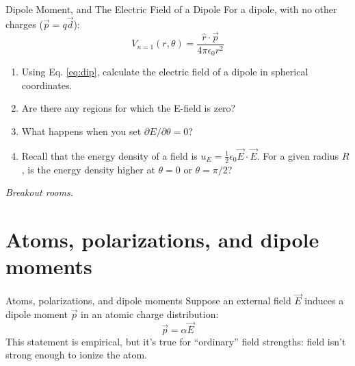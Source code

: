 \documentclass{beamer}
\begin{document}
\begin{frame}{Dipole Moment, and The Electric Field of a Dipole}
For a dipole, with no other charges ($\vec{p} = q\vec{d}$):
\begin{equation}
V_{n=1}(r,\theta) = \frac{\hat{r}\cdot\vec{p}}{4\pi\epsilon_0 r^2} \label{eq:dip}
\end{equation}
\begin{enumerate}
\item Using Eq. \ref{eq:dip}, calculate the electric field of a dipole in spherical coordinates.
\item Are there any regions for which the E-field is zero?
\item What happens when you set $\partial E/\partial \theta = 0$?
\item Recall that the energy density of a field is $u_E = \frac{1}{2}\epsilon_0 \vec{E} \cdot \vec{E}$.  For a given radius $R$, is the energy density higher at $\theta = 0$ or $\theta = \pi/2$?
\end{enumerate}
\textit{Breakout rooms.}
\end{frame}

\section{Atoms, polarizations, and dipole moments}

\begin{frame}{Atoms, polarizations, and dipole moments}
Suppose an external field $\vec{E}$ induces a dipole moment $\vec{p}$ in an atomic charge distribution:
\begin{equation}
\boxed{
\vec{p} = \alpha \vec{E}
}
\end{equation}
This statement is empirical, but it's true for ``ordinary'' field strengths: field isn't strong enough to ionize the atom.
\end{frame}
\end{document}
